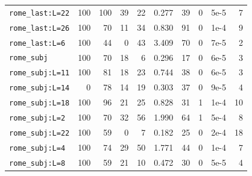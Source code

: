 \begin{tabular}{lrrrrrrrrr}
\texttt{rome\_last:L=22} & 100 & 100 & 39 & 22 & 0.277 & 39 & 0 & 5e-5 & 7 \\
\texttt{rome\_last:L=26} & 100 & 70 & 11 & 34 & 0.830 & 91 & 0 & 1e-4 & 9 \\
\texttt{rome\_last:L=6} & 100 & 44 & 0 & 43 & 3.409 & 70 & 0 & 7e-5 & 2 \\
\texttt{rome\_subj} & 100 & 70 & 18 & 6 & 0.296 & 17 & 0 & 6e-5 & 3 \\
\texttt{rome\_subj:L=11} & 100 & 81 & 18 & 23 & 0.744 & 38 & 0 & 6e-5 & 3 \\
\texttt{rome\_subj:L=14} & 0 & 78 & 14 & 19 & 0.303 & 37 & 0 & 9e-5 & 4 \\
\texttt{rome\_subj:L=18} & 100 & 96 & 21 & 25 & 0.828 & 31 & 1 & 1e-4 & 10 \\
\texttt{rome\_subj:L=2} & 100 & 70 & 32 & 56 & 1.990 & 64 & 1 & 5e-4 & 8 \\
\texttt{rome\_subj:L=22} & 100 & 59 & 0 & 7 & 0.182 & 25 & 0 & 2e-4 & 18 \\
\texttt{rome\_subj:L=4} & 100 & 74 & 29 & 50 & 1.771 & 44 & 0 & 1e-4 & 7 \\
\texttt{rome\_subj:L=8} & 100 & 59 & 21 & 10 & 0.472 & 30 & 0 & 5e-5 & 4 \\
\bottomrule
\end{tabular}
